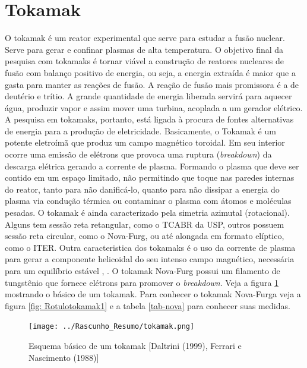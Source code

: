 \documentclass[12pt,oneside,a4paper]{abntex2}
\begin{document}
\section{Tokamak} 
O tokamak é um reator experimental que serve para estudar a fusão nuclear. Serve para gerar e confinar plasmas de alta temperatura. O objetivo final da pesquisa com tokamaks é tornar viável a construção de reatores nucleares de fusão com balanço positivo de energia, ou seja, a energia extraída é maior que a gasta para manter as reações de fusão. A reação de fusão mais promissora é a de deutério e trítio. A grande quantidade de energia liberada servirá para aquecer água, produzir vapor e assim mover uma turbina, acoplada a um gerador elétrico. A pesquisa em tokamaks, portanto, está ligada à procura de fontes alternativas de energia para a produção de eletricidade. 
Basicamente, o Tokamak é um potente eletroímã que produz um campo magnético toroidal. Em seu interior ocorre uma emissão de elétrons que provoca uma ruptura (\textit{breakdown}) da descarga elétrica gerando a corrente de plasma. Formando o plasma que deve ser contido em um espaço limitado, não permitindo que toque nas paredes internas do reator, tanto para não danificá-lo, quanto para não dissipar a energia do plasma via condução térmica ou contaminar o plasma com átomos e moléculas pesadas. O tokamak é ainda caracterizado pela simetria azimutal (rotacional). Alguns tem sessão reta retangular, como o TCABR da USP, outros possuem sessão reta circular, como o Nova-Furg, ou até alongada em formato elíptico, como o ITER. Outra caracteristica dos tokamaks é o uso da corrente de plasma para gerar a componente helicoidal do seu intenso campo magnético, necessária para um equilíbrio estável \cite[p. 34]{tokamaks}, \cite[p. 10]{MagneticControl} . O tokamak Nova-Furg possui um filamento de tungstênio que fornece elétrons para promover o \textit{breakdown}.  
Veja a figura \ref{fig: Rotulotokamak} mostrando o básico de um tokamak. Para conhecer o tokamak Nova-Furga veja a figura \ref{fig: Rotulotokamak1} e a tabela \ref{tab-nova} para conhecer suas medidas. 
\newpage
\begin{figure}[h]
\centering
\caption{Esquema básico de um tokamak [Daltrini (1999), Ferrari e Nascimento (1988)]}
\label{fig: Rotulotokamak}
\texttt{[image: ../Rascunho\_Resumo/tokamak.png]}   
\end{figure}
\newpage
\end{document}
